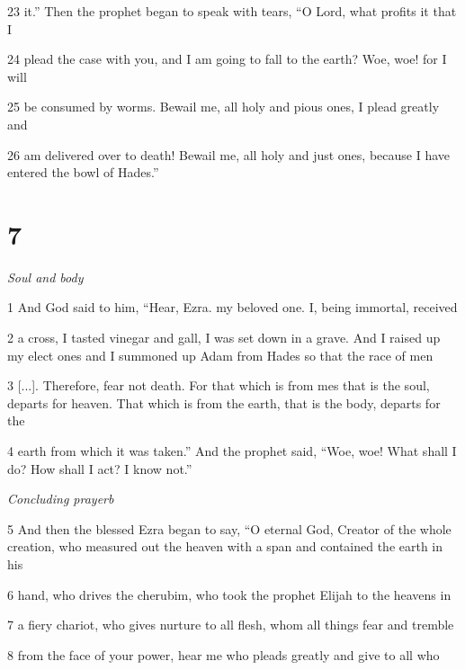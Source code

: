 \par 23 it.” Then the prophet began to speak with tears, “O Lord, what profits it that I

\par 24 plead the case with you, and I am going to fall to the earth? Woe, woe! for I will

\par 25 be consumed by worms. Bewail me, all holy and pious ones, I plead greatly and

\par 26 am delivered over to death! Bewail me, all holy and just ones, because I have entered the bowl of Hades.”

\chapter{7}

\par \textit{Soul and body}

\par 1 And God said to him, “Hear, Ezra. my beloved one. I, being immortal, received

\par 2 a cross, I tasted vinegar and gall, I was set down in a grave. And I raised up my elect ones and I summoned up Adam from Hades so that the race of men

\par 3 [...]. Therefore, fear not death. For that which is from mes that is the soul, departs for heaven. That which is from the earth, that is the body, departs for the

\par 4 earth from which it was taken.” And the prophet said, “Woe, woe! What shall I do? How shall I act? I know not.”

\par \textit{Concluding prayerb}

\par 5 And then the blessed Ezra began to say, “O eternal God, Creator of the whole creation, who measured out the heaven with a span and contained the earth in his

\par 6 hand, who drives the cherubim, who took the prophet Elijah to the heavens in

\par 7 a fiery chariot, who gives nurture to all flesh, whom all things fear and tremble

\par 8 from the face of your power, hear me who pleads greatly and give to all who 

